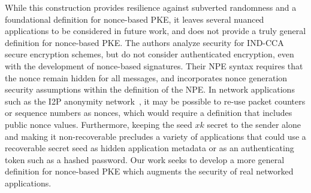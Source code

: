 While this construction provides resilience against subverted randomness and a foundational definition for nonce-based PKE,
it leaves several nuanced applications to be considered in future work, and does not provide a truly general definition for nonce-based PKE.
The authors analyze security for IND-CCA secure encryption schemes, but do not consider authenticated encryption, even
with the development of nonce-based signatures.  Their NPE syntax requires that the nonce remain hidden for all messages,
and incorporates nonce generation security assumptions within the definition of the NPE.  In network applications such as 
the I2P anonymity network~\cite{zantout2011}, it may be possible to re-use packet counters or sequence numbers as nonces, which would
require a definition that includes public nonce values.  Furthermore, keeping the seed $xk$ secret to the sender alone and
making it non-recoverable precludes a variety of applications that could use a recoverable secret
seed as hidden application metadata or as an authenticating token such as a hashed password.  Our work seeks to develop a more general
definition for nonce-based PKE which augments the security of real networked applications.



